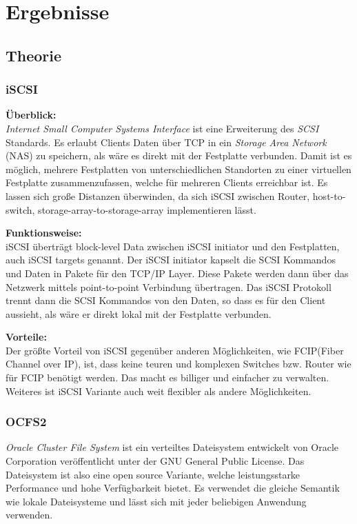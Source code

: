
\section{Ergebnisse}
\subsection{Theorie}
\subsubsection{iSCSI}
\textbf{Überblick:}\\
\textit{Internet Small Computer Systems Interface} ist eine Erweiterung des \textit{SCSI} Standards. Es erlaubt Clients Daten über TCP in ein \textit{Storage Area Network} (NAS) zu speichern, als wäre es direkt mit der Festplatte verbunden. Damit ist es möglich, mehrere Festplatten von unterschiedlichen Standorten zu einer virtuellen Festplatte zusammenzufassen, welche für mehreren Clients erreichbar ist. Es lassen sich große Distanzen überwinden, da sich iSCSI zwischen Router, host-to-switch, storage-array-to-storage-array implementieren lässt. 

\textbf{Funktionsweise:}\\
iSCSI überträgt block-level Data zwischen iSCSI initiator und den Festplatten, auch iSCSI targets genannt. Der iSCSI initiator kapselt die SCSI Kommandos und Daten in Pakete für den TCP/IP Layer. Diese Pakete werden dann über das Netzwerk mittels point-to-point Verbindung übertragen. Das iSCSI Protokoll trennt dann die SCSI Kommandos von den Daten, so dass es für den Client aussieht, als wäre er direkt lokal mit der Festplatte verbunden.


\textbf{Vorteile:}\\
Der größte Vorteil von iSCSI gegenüber anderen Möglichkeiten, wie FCIP(Fiber Channel over IP), ist, dass keine teuren und komplexen Switches bzw. Router wie für FCIP benötigt werden. Das macht es billiger und einfacher zu verwalten. Weiteres ist iSCSI Variante auch weit flexibler als andere Möglichkeiten. 
\\

\subsubsection{OCFS2}
\textit{Oracle Cluster File System} ist ein verteiltes Dateisystem entwickelt von Oracle Corporation veröffentlicht unter der GNU General Public License. Das Dateisystem ist also eine open source Variante, welche leistungsstarke Performance und hohe Verfügbarkeit bietet. Es verwendet die gleiche Semantik wie lokale Dateisysteme und lässt sich mit jeder beliebigen Anwendung verwenden. 

